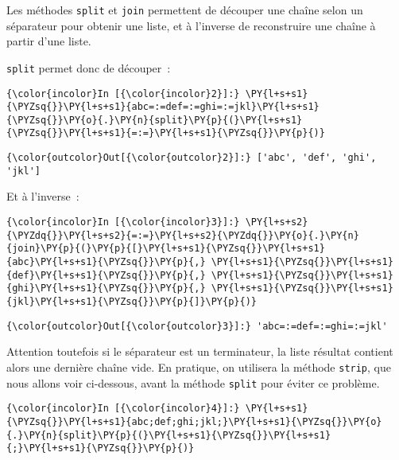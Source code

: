     Les méthodes \texttt{split} et \texttt{join} permettent de découper une
chaîne selon un séparateur pour obtenir une liste, et à l'inverse de
reconstruire une chaîne à partir d'une liste.

    \texttt{split} permet donc de découper~:

    \begin{Verbatim}[commandchars=\\\{\}]
{\color{incolor}In [{\color{incolor}2}]:} \PY{l+s+s1}{\PYZsq{}}\PY{l+s+s1}{abc=:=def=:=ghi=:=jkl}\PY{l+s+s1}{\PYZsq{}}\PY{o}{.}\PY{n}{split}\PY{p}{(}\PY{l+s+s1}{\PYZsq{}}\PY{l+s+s1}{=:=}\PY{l+s+s1}{\PYZsq{}}\PY{p}{)}
\end{Verbatim}


\begin{Verbatim}[commandchars=\\\{\}]
{\color{outcolor}Out[{\color{outcolor}2}]:} ['abc', 'def', 'ghi', 'jkl']
\end{Verbatim}
            
    Et à l'inverse~:

    \begin{Verbatim}[commandchars=\\\{\}]
{\color{incolor}In [{\color{incolor}3}]:} \PY{l+s+s2}{\PYZdq{}}\PY{l+s+s2}{=:=}\PY{l+s+s2}{\PYZdq{}}\PY{o}{.}\PY{n}{join}\PY{p}{(}\PY{p}{[}\PY{l+s+s1}{\PYZsq{}}\PY{l+s+s1}{abc}\PY{l+s+s1}{\PYZsq{}}\PY{p}{,} \PY{l+s+s1}{\PYZsq{}}\PY{l+s+s1}{def}\PY{l+s+s1}{\PYZsq{}}\PY{p}{,} \PY{l+s+s1}{\PYZsq{}}\PY{l+s+s1}{ghi}\PY{l+s+s1}{\PYZsq{}}\PY{p}{,} \PY{l+s+s1}{\PYZsq{}}\PY{l+s+s1}{jkl}\PY{l+s+s1}{\PYZsq{}}\PY{p}{]}\PY{p}{)}
\end{Verbatim}


\begin{Verbatim}[commandchars=\\\{\}]
{\color{outcolor}Out[{\color{outcolor}3}]:} 'abc=:=def=:=ghi=:=jkl'
\end{Verbatim}
            
    Attention toutefois si le séparateur est un terminateur, la liste
résultat contient alors une dernière chaîne vide. En pratique, on
utilisera la méthode \texttt{strip}, que nous allons voir ci-dessous,
avant la méthode \texttt{split} pour éviter ce problème.

    \begin{Verbatim}[commandchars=\\\{\}]
{\color{incolor}In [{\color{incolor}4}]:} \PY{l+s+s1}{\PYZsq{}}\PY{l+s+s1}{abc;def;ghi;jkl;}\PY{l+s+s1}{\PYZsq{}}\PY{o}{.}\PY{n}{split}\PY{p}{(}\PY{l+s+s1}{\PYZsq{}}\PY{l+s+s1}{;}\PY{l+s+s1}{\PYZsq{}}\PY{p}{)}
\end{Verbatim}


